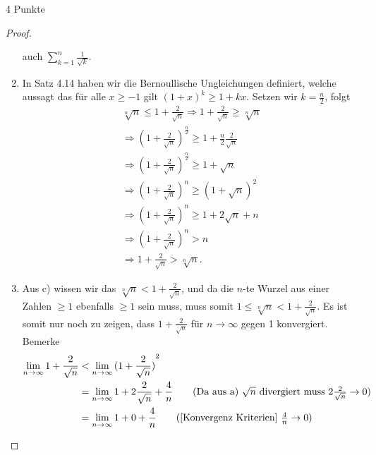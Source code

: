 \documentclass{problemset}
\begin{document}
\begin{problem}{4 Punkte}
\begin{proof}
\begin{enumerate}
              auch $\sum_{k=1}^{n} \frac{1}{\sqrt{k}}$. \checkmark
        \item In Satz 4.14 haben wir die Bernoullische Ungleichungen definiert, welche
              aussagt das für alle $x \ge -1$ gilt ${(1+x)}^k \ge 1 + kx$. Setzen wir $k =
                  \frac{n}{2}$, folgt
              \begin{align*}
                  \sqrt[n]{n} \leq 1 + \frac{2}{\sqrt{n}} \Longrightarrow 1 + \frac{2}{\sqrt{n}} \ge \sqrt[n]{n} \\
                  \Longrightarrow {(1 + \frac{2}{\sqrt{n}})}^{\frac{n}{2}} \ge 1 + \frac{n}{2}\frac{2}{\sqrt{n}} \\
                  \Longrightarrow {(1 + \frac{2}{\sqrt{n}})}^{\frac{n}{2}} \ge 1 + \sqrt{n}                      \\
                  \Longrightarrow {(1 + \frac{2}{\sqrt{n}})}^n \ge {(1 + \sqrt{n})}^{2}                          \\
                  \Longrightarrow {(1 + \frac{2}{\sqrt{n}})}^n \ge 1 + 2\sqrt{n} + n                             \\
                  \Longrightarrow {(1 + \frac{2}{\sqrt{n}})}^n > n                                               \\
                  \Longrightarrow 1 + \frac{2}{\sqrt{n}} > \sqrt[n]{n}.
              \end{align*}
              \checkmark
        \item Aus c) wissen wir das $\sqrt[n]{n} < 1 + \frac{2}{\sqrt{n}}$, und da die $n$-te
              Wurzel aus einer Zahlen $\ge 1$ ebenfalls $\ge 1$ sein muss, muss somit $1 \le
                  \sqrt[n]{n} < 1 + \frac{2}{\sqrt{n}}$. Es ist somit nur noch zu zeigen, dass $1
                  + \frac{2}{\sqrt{n}}$ für $n \to \infty$ gegen 1 konvergiert. Bemerke
              \begin{align*}
                  \lim_{n \to \infty} 1 + \frac{2}{\sqrt{n}} & < \lim_{n \to \infty} {( 1 + \frac{2}{\sqrt{n}})}^2                                                                                 \\
                                                             & = \lim_{n \to \infty} 1 + 2\frac{2}{\sqrt{n}} + \frac{4}{n} \tag{Da aus a) $\sqrt{n}$ divergiert muss $ 2\frac{2}{\sqrt{n}} \to 0$} \\
                                                             & = \lim_{n \to \infty} 1 + 0 + \frac{4}{n} \tag{[Konvergenz Kriterien] $\frac{4}{n} \to 0$}                                          \\

\end{align*}
\end{enumerate}
\end{proof}
\end{problem}
\end{document}
